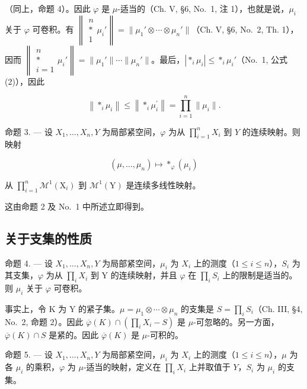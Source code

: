 （同上，命题 4）。因此 \(\varphi\) 是 \(\mu\)-适当的（Ch. V, §6, No.~1, 注 1），也就是说，\(\mu_i\) 关于 \(\varphi\) 可卷积。有 \(\left\| \begin{array}{c} n \\ * \\ 1 \end{array} \mu_i'\right\| = \| \mu_1' \otimes \cdots \otimes \mu_n'\|\)（Ch. V, §6, No.~2, Th. 1），因而 \(\left\| \begin{array}{c} n \\ * \\ i=1 \end{array} \mu_i'\right\| = \| \mu_1'\| \cdots \| \mu_n'\|\)。最后，\(| *_{i} \mu_i| \leqslant *_{i} \mu_i'\)（No.~1, 公式 (2)），因此

\[
\left\| \ast_ {i} \mu_ {i} \right\| \leqslant \left\| \ast_ {i} \mu_ {i} ^ {\prime} \right\| = \prod_ {i = 1} ^ {n} \| \mu_ {i} \|.
\]

命题 3. --- 设 \(X_1, \ldots, X_n, Y\) 为局部紧空间，\(\varphi\) 为从 \(\prod_{i=1}^{n} X_i\) 到 \(Y\) 的连续映射。则映射

\[
(\mu , \dots , \mu_ {n}) \mapsto * _ {\varphi} (\mu_ {i})
\]

从 \(\prod_{i=1}^{n} \mathcal{M}^1(\mathrm{X}_i)\) 到 \(\mathcal{M}^1(\mathrm{Y})\) 是连续多线性映射。

这由命题 2 及 No.~1 中所述立即得到。

\subsection{关于支集的性质}

命题 4. --- 设 \(X_{1},\ldots,X_{n},Y\) 为局部紧空间，\(\mu_{i}\) 为 \(X_{i}\) 上的测度（\(1\leqslant i\leqslant n\)），\(S_{i}\) 为其支集，\(\varphi\) 为从 \(\prod_{i} X_{i}\) 到 Y 的连续映射，并且 \(\varphi\) 在 \(\prod_{i} S_{i}\) 上的限制是适当的。则 \(\mu_{i}\) 关于 \(\varphi\) 可卷积。

事实上，令 K 为 Y 的紧子集。\(\mu = \mu_{1} \otimes \cdots \otimes \mu_{n}\) 的支集是 \(S = \prod_{i} S_{i}\)（Ch. III, §4, No.~2, 命题 2）。因此 \(\overline{\varphi}(K) \cap \left( \prod_{i} X_{i} - S \right)\) 是 \(\mu\)-可忽略的。另一方面，\(\overline{\varphi}(K) \cap S\) 是紧的。因此 \(\overline{\varphi}(K)\) 是 \(\mu\)-可积的。

命题 5. --- 设 \(X_1, \ldots, X_n, Y\) 为局部紧空间，\(\mu_i\) 为 \(X_i\) 上的测度（\(1 \leqslant i \leqslant n\)），\(\mu\) 为各 \(\mu_i\) 的乘积，\(\varphi\) 为 \(\mu\)-适当的映射，定义在 \(\prod_i X_i\) 上并取值于 \(Y\)，\(S_i\) 为 \(\mu_i\) 的支集。

